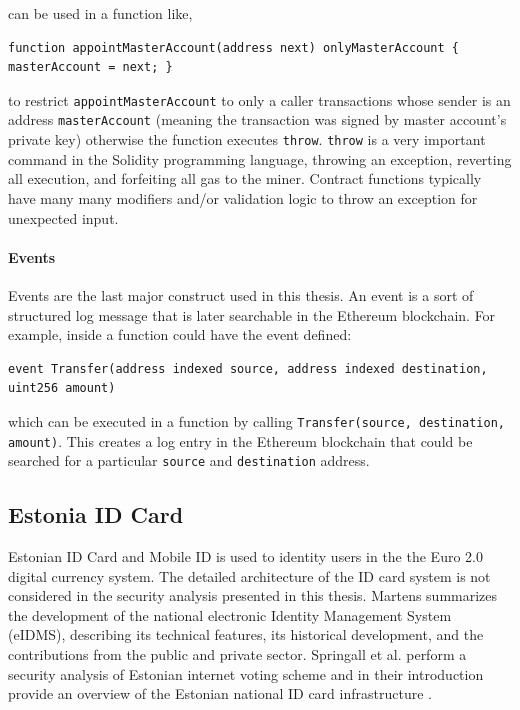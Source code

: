 \documentclass[a4paper,12pt]{article} %
\def\code#1{\texttt{#1}}
\begin{document}
can be used in a function like,

\lstset{basicstyle=\scriptsize}
\begin{lstlisting}
function appointMasterAccount(address next) onlyMasterAccount { masterAccount = next; }
\end{lstlisting}

to restrict \code{appointMasterAccount} to only a caller transactions whose sender is an address \code{masterAccount} (meaning the transaction was signed by master account's private key) otherwise the function executes \code{throw}. \code{throw} is a very important command in the Solidity programming language, throwing an exception, reverting all execution, and forfeiting all gas to the miner. Contract functions typically have many many modifiers and/or validation logic to throw an exception for unexpected input.

\paragraph*{Events}

Events are the last major construct used in this thesis. An event is a sort of structured log message that is later searchable in the Ethereum blockchain. For example, inside a function could have the event defined:

\lstset{basicstyle=\scriptsize}
\begin{lstlisting}
event Transfer(address indexed source, address indexed destination, uint256 amount)
\end{lstlisting}

which can be executed in a function by calling \code{Transfer(source, destination, amount)}. This creates a log entry in the Ethereum blockchain that could be searched for a particular \code{source} and \code{destination} address.

\subsection{Estonia ID Card} \label{ssec:2:estoniaIdCard}

Estonian ID Card and Mobile ID is used to identity users in the the Euro 2.0 digital currency system. The detailed architecture of the ID card system is not considered in the security analysis presented in this thesis. Martens summarizes the development of the national electronic Identity Management System (eIDMS), describing its technical features, its historical development, and the contributions from the public and private sector\cite{Martens2010electronicIdentity}. Springall et al. perform a security analysis of Estonian internet voting scheme and in their introduction provide an overview of the Estonian national ID card infrastructure \cite{estoniaInternetVoting}.
\end{document}
